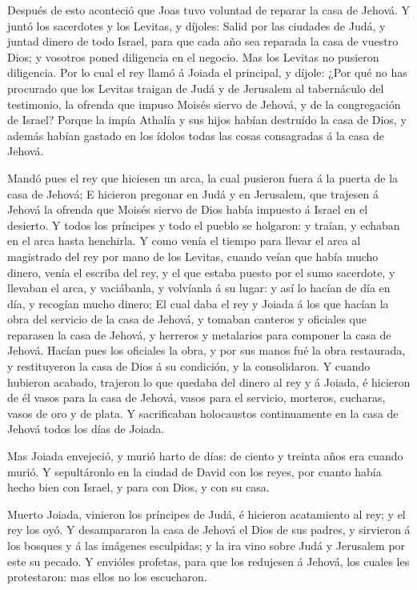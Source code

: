  Después de esto aconteció que Joas tuvo voluntad de reparar
la casa de Jehová.  Y juntó los sacerdotes y los Levitas, y
díjoles: Salid por las ciudades de Judá, y juntad dinero de todo Israel,
para que cada año sea reparada la casa de vuestro Dios; y vosotros poned
diligencia en el negocio. Mas los Levitas no pusieron diligencia.
 Por lo cual el rey llamó á Joiada el principal, y díjole:
¿Por qué no has procurado que los Levitas traigan de Judá y de Jerusalem
al tabernáculo del testimonio, la ofrenda que impuso Moisés siervo de
Jehová, y de la congregación de Israel?  Porque la impía
Athalía y sus hijos habían destruído la casa de Dios, y además habían
gastado en los ídolos todas las cosas consagradas á la casa de Jehová.

 Mandó pues el rey que hiciesen un arca, la cual pusieron
fuera á la puerta de la casa de Jehová;  E hicieron pregonar
en Judá y en Jerusalem, que trajesen á Jehová la ofrenda que Moisés
siervo de Dios había impuesto á Israel en el desierto.  Y
todos los príncipes y todo el pueblo se holgaron: y traían, y echaban en
el arca hasta henchirla.  Y como venía el tiempo para
llevar el arca al magistrado del rey por mano de los Levitas, cuando
veían que había mucho dinero, venía el escriba del rey, y el que estaba
puesto por el sumo sacerdote, y llevaban el arca, y vaciábanla, y
volvíanla á su lugar: y así lo hacían de día en día, y recogían mucho
dinero;  El cual daba el rey y Joiada á los que hacían la
obra del servicio de la casa de Jehová, y tomaban canteros y oficiales
que reparasen la casa de Jehová, y herreros y metalarios para componer
la casa de Jehová.  Hacían pues los oficiales la obra, y
por sus manos fué la obra restaurada, y restituyeron la casa de Dios á
su condición, y la consolidaron.  Y cuando hubieron
acabado, trajeron lo que quedaba del dinero al rey y á Joiada, é
hicieron de él vasos para la casa de Jehová, vasos para el servicio,
morteros, cucharas, vasos de oro y de plata. Y sacrificaban holocaustos
continuamente en la casa de Jehová todos los días de Joiada.

 Mas Joiada envejeció, y murió harto de días: de ciento y
treinta años era cuando murió.  Y sepultáronlo en la ciudad
de David con los reyes, por cuanto había hecho bien con Israel, y para
con Dios, y con su casa.

 Muerto Joiada, vinieron los príncipes de Judá, é hicieron
acatamiento al rey; y el rey los oyó.  Y desampararon la
casa de Jehová el Dios de sus padres, y sirvieron á los bosques y á las
imágenes esculpidas; y la ira vino sobre Judá y Jerusalem por este su
pecado.  Y envióles profetas, para que los redujesen á
Jehová, los cuales les protestaron: mas ellos no los escucharon.

